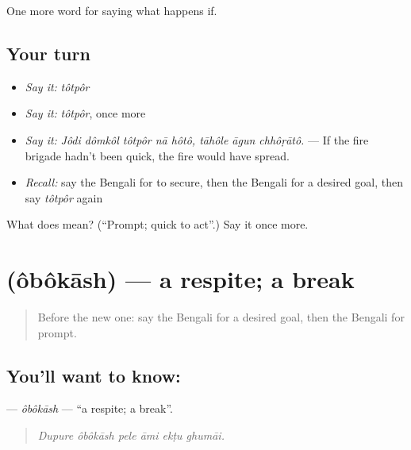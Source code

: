 \begin{grammarlens}[title={What you've built}]
One more word for saying what happens if.
\end{grammarlens}

\subsection*{Your turn}
\begin{itemize}
\raggedright
  \item \emph{Say it:} \emph{tôtpôr}
  \item \emph{Say it:} \emph{tôtpôr}, once more
  \item \emph{Say it:} \emph{Jôdi dômkôl tôtpôr nā hôtô, tāhôle āgun chhôṛātô.} — If the fire brigade hadn't been quick, the fire would have spread.
  \item \emph{Recall:} say the Bengali for to secure, then the Bengali for a desired goal, then say \emph{tôtpôr} again
\end{itemize}

\begin{tcolorbox}[breakable,colback=teal!4,colframe=teal!35!black,title={Before you move on}]
What does  mean? (\textquotedblleft{}Prompt; quick to act\textquotedblright{}.) Say it once more.
\end{tcolorbox}
\section[\texorpdfstring{\bn{অবকাশ} (ôbôkāsh)}{অবকাশ (ôbôkāsh)}]{ (ôbôkāsh) — a respite; a break}

\label{lesson:BN-C544-obokash}



\begin{quote}
Before the new one: say the Bengali for a desired goal, then the Bengali for prompt.
\end{quote}

\subsection*{You'll want to know: }
\textbf{} — \emph{ôbôkāsh} — \textquotedblleft{}a respite; a break\textquotedblright{}.

\begin{quote}
     
\end{quote}

\begin{quote}
\emph{Dupure ôbôkāsh pele āmi ekṭu ghumāi.}
\end{quote}

